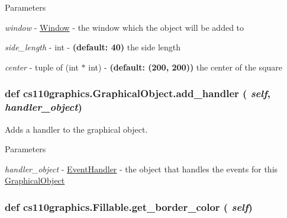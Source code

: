 \begin{DoxyParams}{Parameters}
\item[{\em window}]-\/ \hyperlink{classcs110graphics_1_1Window}{Window} -\/ the window which the object will be added to \item[{\em side\_\-length}]-\/ int -\/ {\bfseries (default: 40)} the side length \item[{\em center}]-\/ tuple of (int $\ast$ int) -\/ {\bfseries (default: (200, 200))} the center of the square \end{DoxyParams}
\hypertarget{classcs110graphics_1_1GraphicalObject_adb1af0d5a6baae3f9a08d21a3227c49f}{
\subsubsection[{add\_\-handler}]{\setlength{\rightskip}{0pt plus 5cm}def cs110graphics.GraphicalObject.add\_\-handler ( {\em self}, \/   {\em handler\_\-object})}}
\label{classcs110graphics_1_1GraphicalObject_adb1af0d5a6baae3f9a08d21a3227c49f}


Adds a handler to the graphical object. 
\begin{DoxyParams}{Parameters}
\item[{\em handler\_\-object}]-\/ \hyperlink{classcs110graphics_1_1EventHandler}{EventHandler} -\/ the object that handles the events for this \hyperlink{classcs110graphics_1_1GraphicalObject}{GraphicalObject} \end{DoxyParams}
\hypertarget{classcs110graphics_1_1Fillable_a6772d56158c9fe98a33f01d47cb8aa41}{
\subsubsection[{get\_\-border\_\-color}]{\setlength{\rightskip}{0pt plus 5cm}def cs110graphics.Fillable.get\_\-border\_\-color ( {\em self})}}
\label{classcs110graphics_1_1Fillable_a6772d56158c9fe98a33f01d47cb8aa41}


